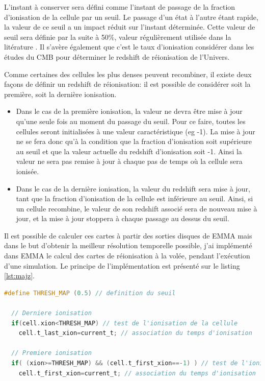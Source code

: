 L'instant à conserver sera défini comme l'instant de passage de la fraction d'ionisation de la cellule par un seuil.
Le passage d'un état à l'autre étant rapide, la valeur de ce seuil a un impact réduit sur l'instant déterminée.
Cette valeur de seuil sera définie par la suite à 50\%, valeur régulièrement utilisée dans la litérature \citep{iliev_cosmological_2006, doi:10.1111/j.1365-2966.2011.18219.x, 2012A&A...548A...9C}.
Il s'avère également que c'est le taux d'ionisation considérer dans les études du \ac{CMB} pour déterminer le redshift de réionisation de l'Univers.

Comme certaines des cellules les plus denses peuvent recombiner, il existe deux façons de définir un redshift de réionisation: il est possible de considérer soit la première, soit la dernière ionisation.

\begin{itemize}
\item Dans le cas de la première ionisation, la valeur ne devra être mise à jour qu'une seule fois au moment du passage du seuil.
Pour ce faire, toutes les cellules seront initialisées à une valeur caractéristique (eg -1).
La mise à jour ne se fera donc qu'à la condition que la fraction d'ionisation soit supérieure au seuil et que la valeur actuelle du redshift d'ionisation soit -1.
Ainsi la valeur ne sera pas remise à jour à chaque pas de temps où la cellule sera ionisée. 

\item Dans le cas de la dernière ionisation, la valeur du redshift sera mise à jour, tant que la fraction d'ionisation de la cellule est inférieure au seuil.
Ainsi, si un cellule recombine, le valeur de son redshift associé sera de nouveau mise à jour, et la mise à jour stoppera à chaque passage au dessus du seuil.
\end{itemize}

Il est possible de calculer ces cartes à partir des sorties disques de EMMA mais dans le but d'obtenir la meilleur résolution temporelle possible, j'ai implémenté dans EMMA le calcul des cartes de réionisation à la volée, pendant l'exécution d'une simulation.
Le principe de l'implémentation est présenté sur le listing \ref{lst:majz}.

\begin{lstlisting}[float=bth,language=c,frame=tb,caption={Mise a jour du redshift de reionisation},label=lst:majz]
  #define THRESH_MAP (0.5) // definition du seuil

  // Derniere ionisation 
  if(cell.xion<THRESH_MAP) // test de l'ionisation de la cellule
    cell.t_last_xion=current_t; // association du temps d'ionisation 

  // Premiere ionisation 
  if( (xion>=THRESH_MAP) && (cell.t_first_xion==-1) ) // test de l'ionisation de la cellule et de premiere ionisation
    cell.t_first_xion=current_t; // association du temps d'ionisation 
\end{lstlisting}

